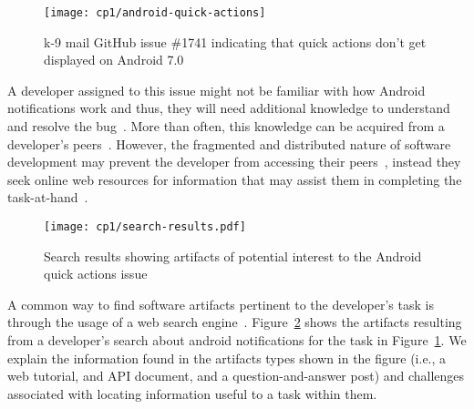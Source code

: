  \medskip
 \begin{figure}[h!]
     \centering
     \texttt{[image: cp1/android-quick-actions]}
     \caption{k-9 mail GitHub issue \#1741 indicating that quick actions don't get displayed on Android 7.0}
     \label{fig:android-notifications-task}
 \end{figure}
 
 
 \medskip
 A developer assigned to this issue might not be familiar with how Android notifications work and thus, they will need additional knowledge to understand and resolve the bug~\cite{ko2007, Li2013, sillito2006}. 
 More than often, this knowledge can be acquired from a developer's peers~\cite{singer2011}. 
 However, the fragmented and distributed nature of software development  
 may prevent the developer from accessing their peers~\cite{ko2007},
 instead they seek online web resources for information 
 that may assist them in completing the task-at-hand~\cite{Xia2017, rao2020}.
 
 
 
 
 
 \begin{figure}
     \centering
     \texttt{[image: cp1/search-results.pdf]}
     \caption{Search results showing artifacts of potential interest to the Android quick actions issue}
     \label{fig:android-search-results}
 \end{figure}
 
 
 
A common way to find software artifacts
pertinent to the developer's task
is through the usage of a web search engine~\cite{Brandt2009a, Li2013}.
Figure~\ref{fig:android-search-results}
shows the artifacts resulting from a developer's search 
about android notifications for the task in Figure~\ref{fig:android-notifications-task}.
We explain the information found in the artifacts types 
shown in the figure  (i.e., a web tutorial, and API document, and a 
question-and-answer post) and challenges associated with locating 
information useful to a task within them.






